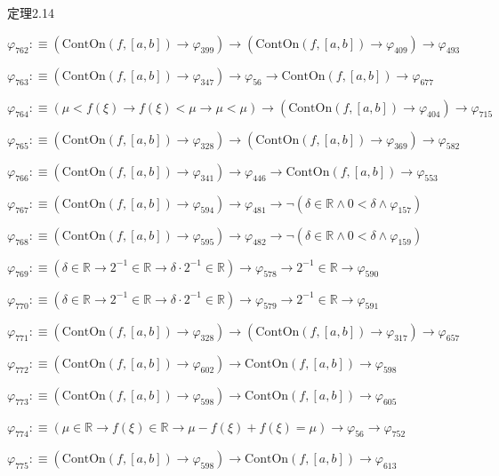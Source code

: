 \begin{fullproof}{定理2.14}
\begin{abbrevlist}
\item $\varphi_{762} :\equiv (\mathrm{ContOn}(f,[a,b]) \to \varphi_{399}) \to (\mathrm{ContOn}(f,[a,b]) \to \varphi_{409}) \to \varphi_{493}$
\item $\varphi_{763} :\equiv (\mathrm{ContOn}(f,[a,b]) \to \varphi_{347}) \to \varphi_{56} \to \mathrm{ContOn}(f,[a,b]) \to \varphi_{677}$
\item $\varphi_{764} :\equiv (\mu < f(\xi) \to f(\xi) < \mu \to \mu < \mu) \to (\mathrm{ContOn}(f,[a,b]) \to \varphi_{404}) \to \varphi_{715}$
\item $\varphi_{765} :\equiv (\mathrm{ContOn}(f,[a,b]) \to \varphi_{328}) \to (\mathrm{ContOn}(f,[a,b]) \to \varphi_{369}) \to \varphi_{582}$
\item $\varphi_{766} :\equiv (\mathrm{ContOn}(f,[a,b]) \to \varphi_{341}) \to \varphi_{446} \to \mathrm{ContOn}(f,[a,b]) \to \varphi_{553}$
\item $\varphi_{767} :\equiv (\mathrm{ContOn}(f,[a,b]) \to \varphi_{594}) \to \varphi_{481} \to \neg (\delta \in \mathbb{R} \land 0 < \delta \land \varphi_{157})$
\item $\varphi_{768} :\equiv (\mathrm{ContOn}(f,[a,b]) \to \varphi_{595}) \to \varphi_{482} \to \neg (\delta \in \mathbb{R} \land 0 < \delta \land \varphi_{159})$
\item $\varphi_{769} :\equiv (\delta \in \mathbb{R} \to 2^{-1} \in \mathbb{R} \to \delta \cdot 2^{-1} \in \mathbb{R}) \to \varphi_{578} \to 2^{-1} \in \mathbb{R} \to \varphi_{590}$
\item $\varphi_{770} :\equiv (\delta \in \mathbb{R} \to 2^{-1} \in \mathbb{R} \to \delta \cdot 2^{-1} \in \mathbb{R}) \to \varphi_{579} \to 2^{-1} \in \mathbb{R} \to \varphi_{591}$
\item $\varphi_{771} :\equiv (\mathrm{ContOn}(f,[a,b]) \to \varphi_{328}) \to (\mathrm{ContOn}(f,[a,b]) \to \varphi_{317}) \to \varphi_{657}$
\item $\varphi_{772} :\equiv (\mathrm{ContOn}(f,[a,b]) \to \varphi_{602}) \to \mathrm{ContOn}(f,[a,b]) \to \varphi_{598}$
\item $\varphi_{773} :\equiv (\mathrm{ContOn}(f,[a,b]) \to \varphi_{598}) \to \mathrm{ContOn}(f,[a,b]) \to \varphi_{605}$
\item $\varphi_{774} :\equiv (\mu \in \mathbb{R} \to f(\xi) \in \mathbb{R} \to \mu - f(\xi) + f(\xi) = \mu) \to \varphi_{56} \to \varphi_{752}$
\item $\varphi_{775} :\equiv (\mathrm{ContOn}(f,[a,b]) \to \varphi_{598}) \to \mathrm{ContOn}(f,[a,b]) \to \varphi_{613}$

\end{abbrevlist}
\end{fullproof}
